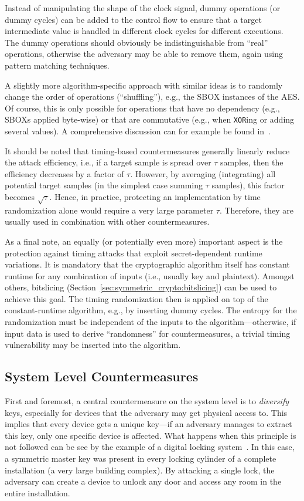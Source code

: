 Instead of manipulating the shape of the clock signal, dummy operations (or dummy cycles) can be added to the control flow to ensure that a target intermediate value is handled in different clock cycles for different executions. The dummy operations should obviously be indistinguishable from ``real'' operations, otherwise the adversary may be able to remove them, again using pattern matching techniques. 

A slightly more algorithm-specific approach with similar ideas is to randomly change the order of operations (``shuffling''), e.g., the \ac{SBOX} instances of the \ac{AES}. Of course, this is only possible for operations that have no dependency (e.g., \acp{SBOX} applied byte-wise) or that are commutative (e.g., when \verb+XOR+ing or adding several values). A comprehensive discussion can for example be found in~\cite{veyrat2012shuffling}.

It should be noted that timing-based countermeasures generally linearly reduce the attack efficiency, i.e., if a target sample is spread over $\tau$ samples, then the efficiency decreases by a factor of $\tau$. However, by averaging (integrating) all potential target samples (in the simplest case summing $\tau$ samples), this factor becomes $\sqrt{\tau}$. Hence, in practice, protecting an implementation by time randomization alone would require a very large parameter $\tau$. Therefore, they are usually used in combination with other countermeasures.

As a final note, an equally (or potentially even more) important aspect is the protection against timing attacks that exploit secret-dependent runtime variations. It is mandatory that the cryptographic algorithm itself has constant runtime for any combination of inputs (i.e., usually key and plaintext). Amongst others, bitslicing (Section~\ref{sec:symmetric_crypto:bitslicing}) can be used to achieve this goal. The timing randomization then is applied on top of the constant-runtime algorithm, e.g., by inserting dummy cycles. The entropy for the randomization must be independent of the inputs to the algorithm---otherwise, if input data is used to derive ``randomness'' for countermeasures, a trivial timing vulnerability may be inserted into the algorithm. 

\subsection{System Level Countermeasures}
First and foremost, a central countermeasure on the system level is to \emph{diversify} keys, especially for devices that the adversary may get physical access to. This implies that every device gets a unique key---if an adversary manages to extract this key, only one specific device is affected. 
%
What happens when this principle is not followed can be see by the example of a digital locking system~\cite{crypto_paper_sv,Oswald13_1}. In this case, a symmetric master key was present in every locking cylinder of a complete installation (a very large building complex). By attacking a single lock, the adversary can create a device to unlock any door and access any room in the entire installation. 

